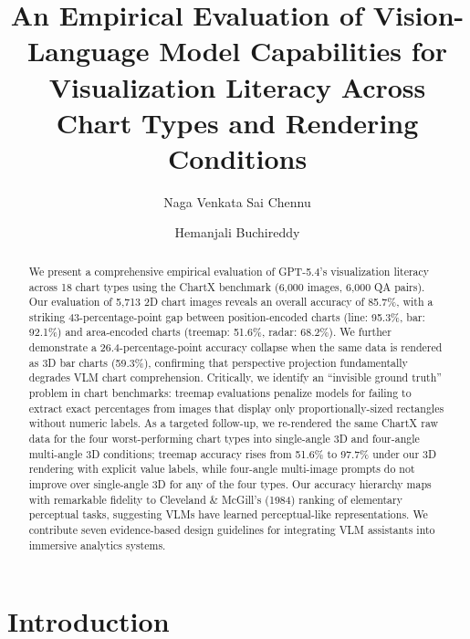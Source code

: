 \documentclass[sigconf, 10pt]{acmart}
\begin{document}
\title{An Empirical Evaluation of Vision-Language Model Capabilities for Visualization Literacy Across Chart Types and Rendering Conditions}

\author{Naga Venkata Sai Chennu}

\author{Hemanjali Buchireddy}

\begin{abstract}
We present a comprehensive empirical evaluation of GPT-5.4's visualization literacy across 18 chart types using the ChartX benchmark (6,000 images, 6,000 QA pairs). Our evaluation of 5,713 2D chart images reveals an overall accuracy of 85.7\%, with a striking 43-percentage-point gap between position-encoded charts (line: 95.3\%, bar: 92.1\%) and area-encoded charts (treemap: 51.6\%, radar: 68.2\%). We further demonstrate a 26.4-percentage-point accuracy collapse when the same data is rendered as 3D bar charts (59.3\%), confirming that perspective projection fundamentally degrades VLM chart comprehension. Critically, we identify an ``invisible ground truth'' problem in chart benchmarks: treemap evaluations penalize models for failing to extract exact percentages from images that display only proportionally-sized rectangles without numeric labels. As a targeted follow-up, we re-rendered the same ChartX raw data for the four worst-performing chart types into single-angle 3D and four-angle multi-angle 3D conditions; treemap accuracy rises from 51.6\% to 97.7\% under our 3D rendering with explicit value labels, while four-angle multi-image prompts do not improve over single-angle 3D for any of the four types. Our accuracy hierarchy maps with remarkable fidelity to Cleveland \& McGill's (1984) ranking of elementary perceptual tasks, suggesting VLMs have learned perceptual-like representations. We contribute seven evidence-based design guidelines for integrating VLM assistants into immersive analytics systems.
\end{abstract}

\maketitle

\section{Introduction}
\end{document}
